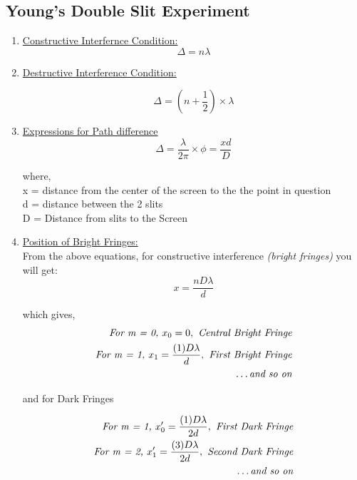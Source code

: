 \documentclass[12pt]{article}
\begin{document}
\subsection{Young's Double Slit Experiment}

	\begin{enumerate}
		\item \underline{Constructive Interfernce Condition:} 
		\begin{equation}
			\Delta = n \lambda
		\end{equation}
		
		\item \underline{Destructive Interference Condition:} 

		\begin{equation}
			\Delta = (n + \frac{1}{2}) \times \lambda 
		\end{equation}


		\item \underline{Expressions for Path difference}
		\begin{equation}
			\Delta = \frac{\lambda}{2\pi} \times \phi = \frac{xd}{D}
		\end{equation}
	
		where, \\
		x = distance from the center of the screen to the the point in question\\
		d = distance between the 2 slits\\
		D = Distance from slits to the Screen
		
		\item \underline{Position of Bright Fringes:}
		\\From the above equations, for constructive interference\textit{ (bright fringes)} you will get: 
		\begin{equation}
			x = \frac{nD\lambda}{d}
		\end{equation}
		
		which gives,\\
		\begin{eqnarray}
			\textit{For m = 0, } x_0 = 0, \textit{ 	Central Bright Fringe}\\
			\textit{For m = 1, } x_1 = \frac{(1)D\lambda}{d}, \textit{ First Bright Fringe}\\
			\textit{\dots and so on}
		\end{eqnarray}
	
	and for Dark Fringes
	
	\begin{eqnarray}
		\textit{For m = 1, } x_0^\prime = \frac{(1)D\lambda}{2d}, \textit{ 	First Dark Fringe}\\
		\textit{For m = 2, } x_1^\prime = \frac{(3)D\lambda}{2d}, \textit{ Second Dark Fringe}\\
		\textit{\dots and so on}
	\end{eqnarray}
	

\end{enumerate}
\end{document}
